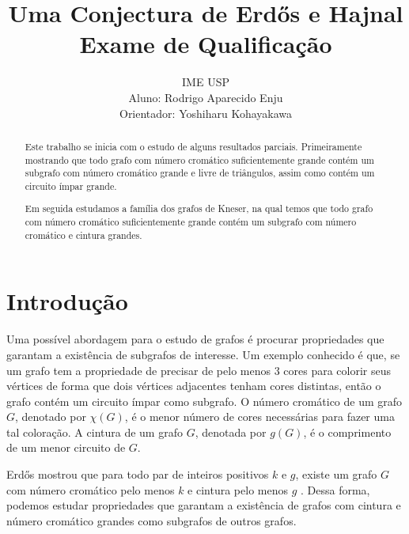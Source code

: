 \documentclass{article}
\title{\textbf{Uma Conjectura de Erd\H{o}s e Hajnal}\\Exame de Qualificação}
\author{IME USP\\Aluno: Rodrigo Aparecido Enju\\Orientador: Yoshiharu Kohayakawa }
\date{}
\begin{document}
\renewcommand{\abstractname}{Resumo}

\maketitle
\begin{abstract}
    Este trabalho se inicia com o estudo de alguns resultados parciais. Primeiramente mostrando que todo grafo com número cromático suficientemente grande contém um subgrafo com número cromático grande e livre de triângulos, assim como contém um circuito ímpar grande.
    
    Em seguida estudamos a família dos grafos de Kneser, na qual temos que todo grafo com número cromático suficientemente grande contém um subgrafo com número cromático e cintura grandes.
\end{abstract}

\section{Introdução}


Uma possível abordagem para o estudo de grafos é procurar propriedades que garantam a existência de subgrafos de interesse. Um exemplo conhecido é que, se um grafo tem a propriedade de precisar de pelo menos $3$ cores para colorir seus vértices de forma que dois vértices adjacentes tenham cores distintas, então o grafo contém um circuito ímpar como subgrafo. O número cromático de um grafo $G$, denotado por $\chi(G)$, é o menor número de cores necessárias para fazer uma tal coloração. A cintura de um grafo $G$, denotada por $g(G)$, é o comprimento de um menor circuito de $G$.

Erd\H{o}s mostrou que para todo par de inteiros positivos $k$ e $g$, existe um grafo $G$ com número cromático pelo menos $k$ e cintura pelo menos $g$ \cite{erdos1959graph}. Dessa forma, podemos estudar propriedades que garantam a existência de grafos com cintura e número cromático grandes como subgrafos de outros grafos.
\end{document}

